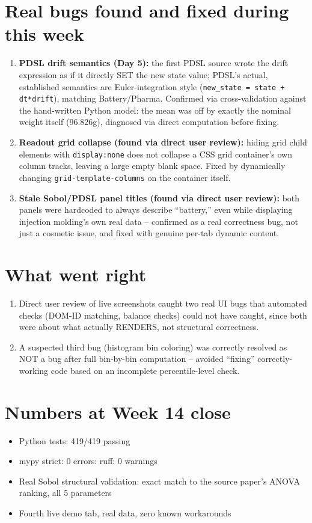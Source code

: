 \documentclass[11pt]{article}
\begin{document}
\section*{Real bugs found and fixed during this week}
\begin{enumerate}[leftmargin=*]
  \item \textbf{PDSL drift semantics (Day 5):} the first PDSL source
    wrote the drift expression as if it directly SET the new state
    value; PDSL's actual, established semantics are Euler-integration
    style (\texttt{new\_state = state + dt*drift}), matching
    Battery/Pharma. Confirmed via cross-validation against the
    hand-written Python model: the mean was off by exactly the
    nominal weight itself (96.826g), diagnosed via direct computation
    before fixing.
  \item \textbf{Readout grid collapse (found via direct user review):}
    hiding grid child elements with \texttt{display:none} does not
    collapse a CSS grid container's own column tracks, leaving a
    large empty blank space. Fixed by dynamically changing
    \texttt{grid-template-columns} on the container itself.
  \item \textbf{Stale Sobol/PDSL panel titles (found via direct user
    review):} both panels were hardcoded to always describe
    ``battery,'' even while displaying injection molding's own real
    data -- confirmed as a real correctness bug, not just a cosmetic
    issue, and fixed with genuine per-tab dynamic content.
\end{enumerate}

\section*{What went right}
\begin{enumerate}[leftmargin=*]
  \item Direct user review of live screenshots caught two real UI
    bugs that automated checks (DOM-ID matching, balance checks)
    could not have caught, since both were about what actually
    RENDERS, not structural correctness.
  \item A suspected third bug (histogram bin coloring) was correctly
    resolved as NOT a bug after full bin-by-bin computation --
    avoided ``fixing'' correctly-working code based on an
    incomplete percentile-level check.
\end{enumerate}

\section*{Numbers at Week 14 close}
\begin{itemize}[leftmargin=*]
  \item Python tests: 419/419 passing
  \item mypy strict: 0 errors: ruff: 0 warnings
  \item Real Sobol structural validation: exact match to the source
    paper's ANOVA ranking, all 5 parameters
  \item Fourth live demo tab, real data, zero known workarounds
\end{itemize}
\end{document}
